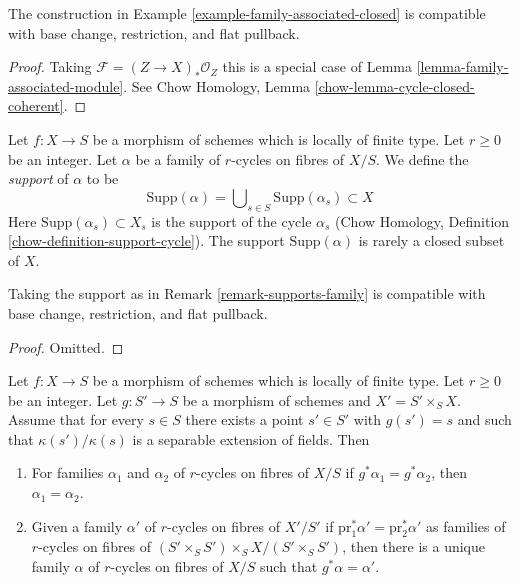 \begin{lemma}
\label{lemma-family-associated-closed}
The construction in Example \ref{example-family-associated-closed}
is compatible with base change, restriction,
and flat pullback.
\end{lemma}

\begin{proof}
Taking $\mathcal{F} = (Z \to X)_*\mathcal{O}_Z$ this is a special case of
Lemma \ref{lemma-family-associated-module}. See
Chow Homology, Lemma \ref{chow-lemma-cycle-closed-coherent}.
\end{proof}

\begin{remark}[Support]
\label{remark-supports-family}
Let $f : X \to S$ be a morphism of schemes which is locally of finite type.
Let $r \geq 0$ be an integer. Let $\alpha$ be a family of $r$-cycles
on fibres of $X/S$. We define the {\it support} of $\alpha$ to be
$$
\text{Supp}(\alpha) =
\bigcup\nolimits_{s \in S} \text{Supp}(\alpha_s) \subset X
$$
Here $\text{Supp}(\alpha_s) \subset X_s$ is the
support of the cycle $\alpha_s$
(Chow Homology, Definition \ref{chow-definition-support-cycle}).
The support $\text{Supp}(\alpha)$
is rarely a closed subset of $X$.
\end{remark}

\begin{lemma}
\label{lemma-support-family}
Taking the support as in Remark \ref{remark-supports-family}
is compatible with base change, restriction, and flat pullback.
\end{lemma}

\begin{proof}
Omitted.
\end{proof}

\begin{lemma}
\label{lemma-descend-family}
Let $f : X \to S$ be a morphism of schemes which is locally of finite type.
Let $r \geq 0$ be an integer. Let $g : S' \to S$ be a morphism of
schemes and $X' = S' \times_S X$. Assume that for every $s \in S$ there
exists a point $s' \in S'$ with $g(s') = s$ and such that
$\kappa(s')/\kappa(s)$ is a separable extension of fields. Then
\begin{enumerate}
\item For families $\alpha_1$ and $\alpha_2$ of $r$-cycles on fibres of $X/S$
if $g^*\alpha_1 = g^*\alpha_2$, then $\alpha_1 = \alpha_2$.
\item Given a family $\alpha'$ of $r$-cycles on fibres of $X'/S'$ if
$\text{pr}_1^*\alpha' = \text{pr}_2^*\alpha'$ as families of
$r$-cycles on fibres of $(S' \times_S S') \times_S X / (S' \times_S S')$,
then there is a unique family $\alpha$ of $r$-cycles on fibres of $X/S$
such that $g^*\alpha = \alpha'$.
\end{enumerate}
\end{lemma}

